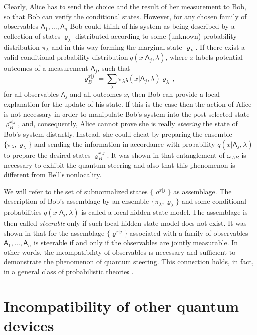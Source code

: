 \documentclass[12pt]{article}
\theoremstyle{definition}
\newcommand{\Ao}{\mathsf{A}}%
\begin{document}
{Clearly, Alice has to send the choice and the result of her measurement 
to Bob, so that Bob can verify the conditional states. However, for any chosen
family of observables $\Ao_1,\dots,\Ao_n$ Bob could think 
of his system as being described by a collection of states $\varrho_\lambda$ 
distributed according to some (unknown) probability distribution $\pi_\lambda$ and in this way forming the marginal state $\varrho_B$. 
If there exist a valid conditional probability distribution $q(x|\Ao_j,\lambda)$, where $x$ labels potential 
outcomes of a measurement $\Ao_j$, such that
\begin{equation}
\varrho_B^{x|j}=\sum_\lambda \pi_\lambda q(x|\Ao_j,\lambda) \varrho_\lambda\,,
\end{equation}
for all observables $\Ao_j$ and all outcomes $x$, then Bob can provide a local explanation for the update of his state. 
If this is the case
then the action of Alice is not necessary in order to manipulate Bob's 
system into the post-selected state $\varrho_B^{x|j}$, and, consequently,
Alice cannot prove she is really \emph{steering} the state of Bob's system
distantly. 
Instead, she could cheat by preparing the ensemble 
$\{\pi_\lambda,\varrho_\lambda\}$ and sending the information in accordance
with probability $q(x|\Ao_j,\lambda)$ to prepare the desired states 
$\varrho_B^{x|j}$. 
It was shown in \cite{WiJoDo07} that entanglement 
of $\omega_{AB}$ is necessary to exhibit the quantum steering 
and also that this phenomenon is different from Bell's nonlocality.

We will refer to the set of subnormalized states
$\{\varrho^{x|j}\}$ as assemblage. 
The description of Bob's assemblage by an ensemble $\{\pi_\lambda,\varrho_\lambda\}$ and some 
conditional probabilities $q(x|\Ao_j,\lambda)$ is called 
a local hidden state model. The assemblage is then
called \emph{steerable} only if such local hidden state 
model does not exist.
It was shown in \cite{QuVeBr14,UoMoGu14} that
for the assemblage $\{\varrho^{x|j}\}$ associated with a family of observables
$\Ao_1,\dots,\Ao_n$ is steerable if and only if the observables are jointly measurable. 
In other words, the incompatibility of observables
is necessary and sufficient to demonstrate the phenomenon of quantum 
steering. 
This connection holds, in fact, in a general class of probabilistic theories \cite{Banik15}.

\section{Incompatibility of other quantum devices}\label{sec:other}

}
\end{document}
